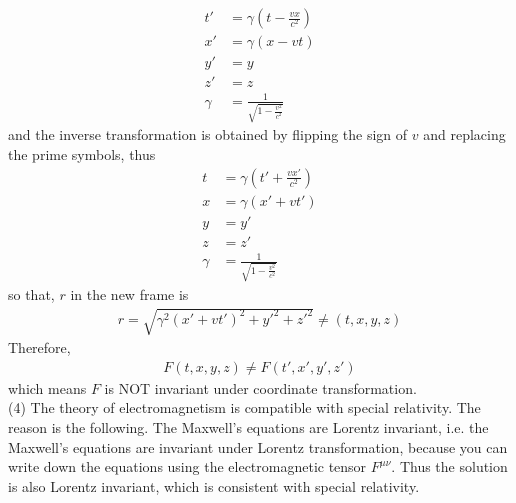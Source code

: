 \documentclass[12pt]{article}
\begin{document}
\begin{align*}
t' &= \gamma \left( t - \frac{v x}{c^2}\right)\\
x' &= \gamma \left( x - v t\right)\\
y' &= y\\
z' &= z\\
\gamma &= \frac{1}{\sqrt{1 - \frac{v^2}{c^2}}}
\end{align*}
and the inverse transformation is obtained by flipping the sign of $v$ and replacing the prime symbols, thus
\begin{align*}
t &= \gamma \left( t' + \frac{v x'}{c^2}\right)\\
x &= \gamma \left( x' + v t'\right)\\
y &= y'\\
z &= z'\\
\gamma &= \frac{1}{\sqrt{1 - \frac{v^2}{c^2}}}
\end{align*}
so that, $r$ in the new frame is
\begin{gather*}
r = \sqrt{\gamma^2 \left( x' + v t'\right)^2 + y'^2 + z'^2} \neq \left(t, x, y, z \right)
\end{gather*}
Therefore,
\begin{gather*}
F(t, x, y, z) \neq  F(t', x', y', z')
\end{gather*}
which means $F$ is NOT invariant under coordinate transformation.\\[1em]
(4)
The theory of electromagnetism is compatible with special relativity. The reason is the following. The Maxwell's equations are Lorentz invariant, i.e. the Maxwell's equations are invariant under Lorentz transformation, because you can write down the equations using the electromagnetic tensor $F^{\mu \nu}$. Thus the solution is also Lorentz invariant, which is consistent with special relativity.
\end{document}
